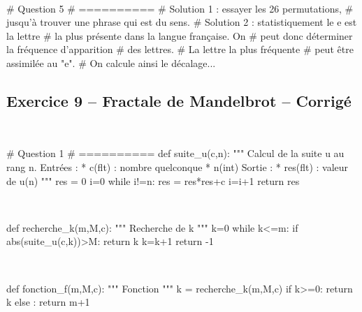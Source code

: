 \documentclass[10pt,fleqn]{article} %
\begin{document}
\begin{multicols}{2}
\begin{corrige}
$\quad$
\begin{python}
# Question 5
# ==========
# Solution 1 : essayer les 26 permutations, 
# jusqu'à trouver une phrase qui est du sens.
# Solution 2 : statistiquement le e est la lettre
# la plus présente dans la langue française. On
# peut donc déterminer la fréquence d'apparition 
# des lettres. # La lettre la plus fréquente 
# peut être assimilée au "e".
# On calcule ainsi le décalage...
\end{python}
\end{corrige}



\subsection*{Exercice 9 -- Fractale de Mandelbrot -- Corrigé}
\begin{corrige}
$\quad$
\begin{python}
# Question 1 
# ==========
def suite_u(c,n):
    """
    Calcul de la suite u au rang n.
    Entrées : 
     * c(flt) : nombre quelconque
     * n(int)
    Sortie : 
     * res(flt) : valeur de u(n)
    """
    res = 0
    i=0
    while i!=n:
        res = res*res+c
        i=i+1
    return res
\end{python}
\end{corrige}

\begin{corrige}
$\quad$
\begin{python}
def recherche_k(m,M,c):
    """ Recherche de k """
    k=0
    while k<=m:
        if abs(suite_u(c,k))>M:
            return k
        k=k+1
    return -1
\end{python}
\end{corrige}

\begin{corrige}
$\quad$
\begin{python}
def fonction_f(m,M,c):
    """ Fonction """
    k = recherche_k(m,M,c)
    if k>=0:
        return k
    else :
        return m+1
\end{python}
\end{corrige}


\end{multicols}
\end{document}
